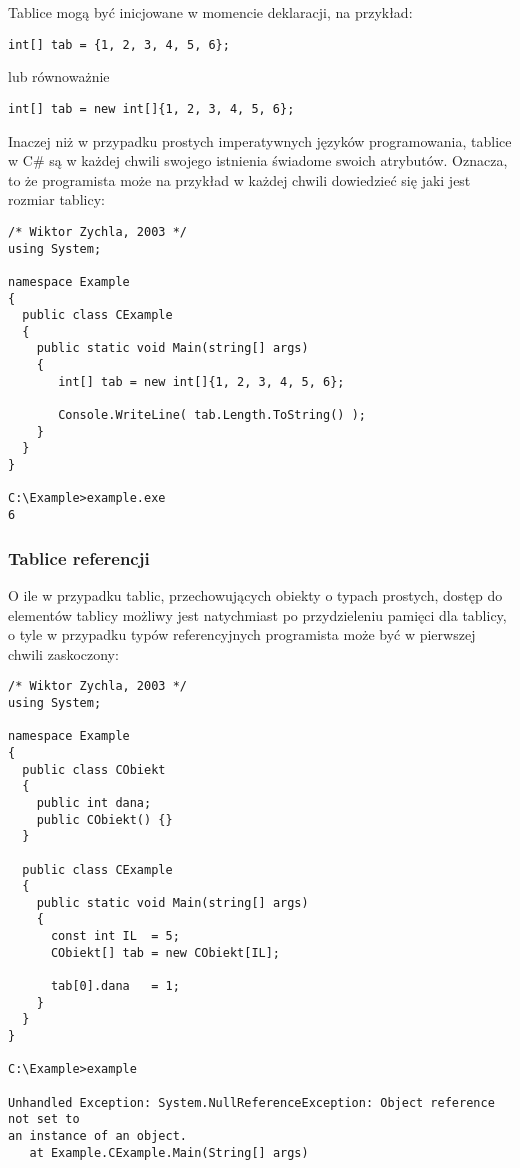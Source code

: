 Tablice mogą być inicjowane w momencie deklaracji, na przykład:

\begin{scriptsize}
\begin{verbatim}
int[] tab = {1, 2, 3, 4, 5, 6};
\end{verbatim}
\end{scriptsize}

lub równoważnie

\begin{scriptsize}
\begin{verbatim}
int[] tab = new int[]{1, 2, 3, 4, 5, 6};
\end{verbatim}
\end{scriptsize}

Inaczej niż w przypadku prostych imperatywnych języków programowania, tablice w C\# są w każdej chwili
swojego istnienia świadome swoich atrybutów. Oznacza, to że programista może na przykład w każdej
chwili dowiedzieć się jaki jest rozmiar tablicy:

\begin{scriptsize}
\begin{verbatim}
/* Wiktor Zychla, 2003 */
using System;

namespace Example
{
  public class CExample 
  {
    public static void Main(string[] args)
    {
       int[] tab = new int[]{1, 2, 3, 4, 5, 6};

       Console.WriteLine( tab.Length.ToString() );
    }
  }
}

C:\Example>example.exe
6
\end{verbatim}
\end{scriptsize}

\subsubsection{Tablice referencji}

O ile w przypadku tablic, przechowujących obiekty o typach prostych, dostęp do elementów tablicy
możliwy jest natychmiast po przydzieleniu pamięci dla tablicy, o tyle w przypadku typów 
referencyjnych programista może być w pierwszej chwili zaskoczony:

\begin{scriptsize}
\begin{verbatim}
/* Wiktor Zychla, 2003 */
using System;

namespace Example
{
  public class CObiekt
  {
    public int dana;
    public CObiekt() {}
  }

  public class CExample 
  {
    public static void Main(string[] args)
    {
      const int IL  = 5;
      CObiekt[] tab = new CObiekt[IL];
   
      tab[0].dana   = 1;           
    }
  }
}

C:\Example>example

Unhandled Exception: System.NullReferenceException: Object reference not set to
an instance of an object.
   at Example.CExample.Main(String[] args)
\end{verbatim}
\end{scriptsize}

